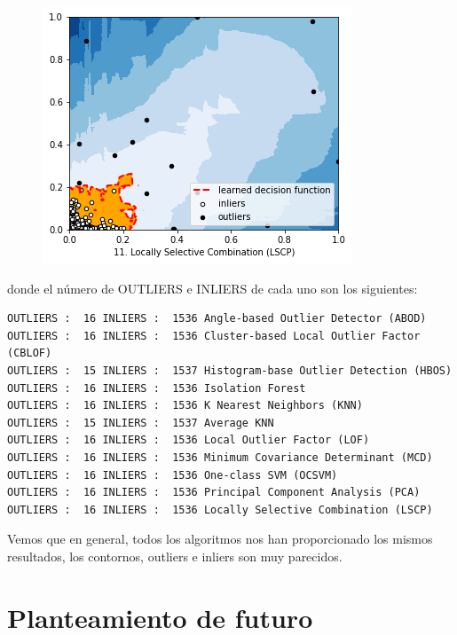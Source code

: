 \documentclass[12pt,twoside]{report}
\begin{document}
\begin{figure}[H]
\includegraphics[width=\textwidth]{../code/figures/lscp.png}
\label{fig:lscp}
\end{figure}

donde el número de OUTLIERS e INLIERS de cada uno son los siguientes:

\begin{lstlisting}
OUTLIERS :  16 INLIERS :  1536 Angle-based Outlier Detector (ABOD)
OUTLIERS :  16 INLIERS :  1536 Cluster-based Local Outlier Factor (CBLOF)
OUTLIERS :  15 INLIERS :  1537 Histogram-base Outlier Detection (HBOS)
OUTLIERS :  16 INLIERS :  1536 Isolation Forest
OUTLIERS :  16 INLIERS :  1536 K Nearest Neighbors (KNN)
OUTLIERS :  15 INLIERS :  1537 Average KNN
OUTLIERS :  16 INLIERS :  1536 Local Outlier Factor (LOF)
OUTLIERS :  16 INLIERS :  1536 Minimum Covariance Determinant (MCD)
OUTLIERS :  16 INLIERS :  1536 One-class SVM (OCSVM)
OUTLIERS :  16 INLIERS :  1536 Principal Component Analysis (PCA)
OUTLIERS :  16 INLIERS :  1536 Locally Selective Combination (LSCP)
\end{lstlisting}

Vemos que en general, todos los algoritmos nos han proporcionado los mismos resultados, los contornos, outliers e inliers son muy parecidos.

\chapter*{Planteamiento de futuro}
\end{document}
